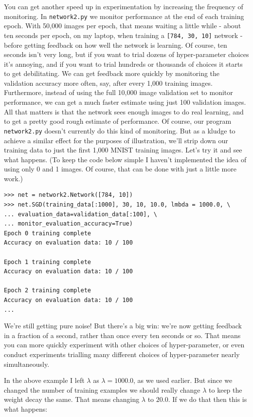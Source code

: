 You can get another speed up in experimentation by increasing the frequency of monitoring. In \texttt{network2.py} we monitor performance at the end of each training epoch. With 50,000 images per epoch, that means waiting a little while - about ten seconds per epoch, on my laptop, when training a \texttt{[784, 30, 10]} network - before getting feedback on how well the network is learning. Of course, ten seconds isn't very long, but if you want to trial dozens of hyper-parameter choices it's annoying, and if you want to trial hundreds or thousands of choices it starts to get debilitating. We can get feedback more quickly by monitoring the validation accuracy more often, say, after every 1,000 training images. Furthermore, instead of using the full 10,000 image validation set to monitor performance, we can get a much faster estimate using just 100 validation images. All that matters is that the network sees enough images to do real learning, and to get a pretty good rough estimate of performance. Of course, our program \texttt{network2.py} doesn't currently do this kind of monitoring. But as a kludge to achieve a similar effect for the purposes of illustration, we'll strip down our training data to just the first 1,000 MNIST training images. Let's try it and see what happens. (To keep the code below simple I haven't implemented the idea of using only 0 and 1 images. Of course, that can be done with just a little more work.)



\begin{lstlisting}
>>> net = network2.Network([784, 10])
>>> net.SGD(training_data[:1000], 30, 10, 10.0, lmbda = 1000.0, \
... evaluation_data=validation_data[:100], \
... monitor_evaluation_accuracy=True)
Epoch 0 training complete
Accuracy on evaluation data: 10 / 100

Epoch 1 training complete
Accuracy on evaluation data: 10 / 100

Epoch 2 training complete
Accuracy on evaluation data: 10 / 100
...

\end{lstlisting}


We're still getting pure noise! But there's a big win: we're now getting feedback in a fraction of a second, rather than once every ten seconds or so. That means you can more quickly experiment with other choices of hyper-parameter, or even conduct experiments trialling many different choices of hyper-parameter nearly simultaneously.


In the above example I left $\lambda$ as $\lambda = 1000.0$, as we used earlier. But since we changed the number of training examples we should really change $\lambda$ to keep the weight decay the same. That means changing $\lambda$ to $20.0$. If we do that then this is what happens:




